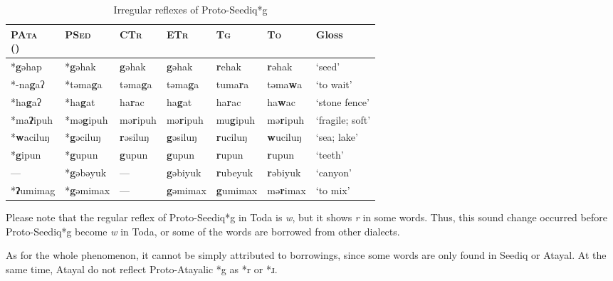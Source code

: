 \documentclass[12pt]{article}
\newcommand{\pata}{\textsc{PAta}\xspace}
\newcommand{\psed}{\textsc{PSed}\xspace}
\newcommand{\psedf}{Proto-Seediq\xspace}
\newcommand{\stg}{\textsc{Tg}\xspace}
\newcommand{\sto}{\textsc{To}\xspace}
\newcommand{\stof}{Toda\xspace}
\newcommand{\sctr}{\textsc{CTr}\xspace}
\newcommand{\setr}{\textsc{ETr}\xspace}
\begin{document}
\begin{table}[]
\centering
\caption{Irregular reflexes of \psedf *g}
\label{tab:g3}
\begin{tabular}{l|l|llll|l}
\makecell[l]{\pata\\(\cite{goderich2020phd})} & \psed             & \sctr            & \setr            & \stg             & \sto             & Gloss           \\ \hline
*\textbf{g}əhap                               & *\textbf{g}əhak   & \textbf{g}əhak   & \textbf{g}əhak   & \textbf{r}ehak   & \textbf{r}əhak   & `seed'          \\
*-na\textbf{g}aʔ                              & *təma\textbf{g}a  & təma\textbf{g}a  & təma\textbf{g}a  & tuma\textbf{r}a  & təma\textbf{w}a  & `to wait'       \\
*ha\textbf{g}aʔ                               & *ha\textbf{g}at   & ha\textbf{r}ac   & ha\textbf{g}at   & ha\textbf{r}ac   & ha\textbf{w}ac   & `stone fence'   \\
*ma\textbf{ʔ}ipuh                             & *mə\textbf{g}ipuh & mə\textbf{r}ipuh & mə\textbf{r}ipuh & mu\textbf{g}ipuh & mə\textbf{r}ipuh & `fragile; soft' \\
*\textbf{w}aciluŋ                             & *\textbf{g}əciluŋ & \textbf{r}əsiluŋ & \textbf{g}əsiluŋ & \textbf{r}uciluŋ & \textbf{w}uciluŋ & `sea; lake'     \\
*\textbf{g}ipun                               & *\textbf{g}upun   & \textbf{g}upun   & \textbf{g}upun   & \textbf{r}upun   & \textbf{r}upun   & `teeth'         \\
---                                           & *\textbf{g}əbəyuk & ---              & \textbf{g}əbiyuk & \textbf{r}ubeyuk & \textbf{r}əbiyuk & `canyon'        \\
*\textbf{ʔ}umimag                             & *\textbf{g}əmimax & ---              & \textbf{g}əmimax & \textbf{g}umimax & mə\textbf{r}imax & `to mix'       
\end{tabular}
\end{table}

Please note that the regular reflex of \psedf *g in \stof is \textit{w}, but it shows \textit{r} in some words. Thus, this sound change occurred before \psedf *g become \textit{w} in \stof, or some of the words are borrowed from other dialects. 

As for the whole phenomenon, it cannot be simply attributed to borrowings, since some words are only found in Seediq or Atayal. At the same time, Atayal do not reflect Proto-Atayalic *g as *r or *ɹ. 
\end{document}
